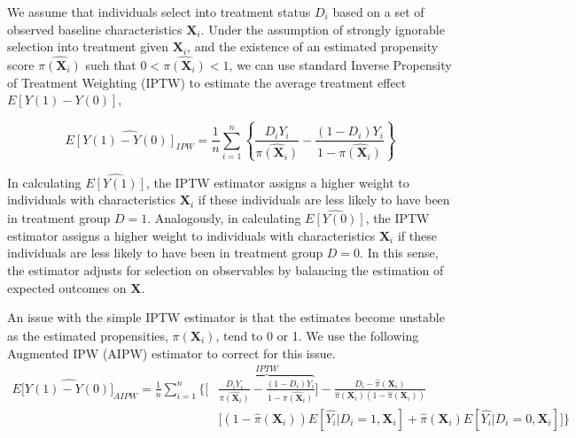 

We assume that individuals select into treatment status $D_i$ based on a set of observed baseline characteristics $\boldsymbol{X}_i$. Under the assumption of strongly ignorable selection into treatment given $\boldsymbol{X}_i$, and the existence of an estimated propensity score $\hat{\pi({\boldsymbol{X}_i})}$ such that $0<\hat{\pi({\boldsymbol{X}_i})}<1$, we can use standard Inverse Propensity of Treatment Weighting (IPTW) to estimate the average treatment effect $E[Y(1)-Y(0)]$,

\begin{equation}\label{eq:IPW}
\widehat{E[Y(1)-Y(0)]_{IPW}} = \frac{1}{n} \sum_{i=1}^{n} \left \{\frac{D_i Y_i}{\hat{\pi(\boldsymbol{X}_i)}} - \frac{(1-D_i)Y_i}{1-\hat{\pi(\boldsymbol{X}_i)}}\right \}
\end{equation}

In calculating $\widehat{E[Y(1)]}$, the IPTW estimator assigns a higher weight to individuals with characteristics $\boldsymbol{X}_i$ if these individuals are less likely to have been in treatment group $D = 1$. Analogously, in calculating $\widehat{E[Y(0)]}$,  the IPTW estimator assigns a higher weight to individuals with characteristics $\boldsymbol{X}_i$ if these individuals are less likely to have been in treatment group $D = 0$. In this sense, the estimator adjusts for selection on observables by balancing the estimation of expected outcomes on $\boldsymbol{X}$.

An issue with the simple IPTW estimator is that the estimates become unstable as the estimated propensities, $\hat{\pi(\boldsymbol{X}_i)}$, tend to 0 or 1. We use the following Augmented IPW (AIPW) estimator to correct for this issue. 
\begin{align}\label{eq:AIPW}
E[\widehat{Y(1)-Y(0)]}_{AIPW} = \frac{1}{n} \sum_{i=1}^{n} \bigg \{ \bigg[ & \overbrace{\frac{D_i Y_i}{\hat{\pi(\boldsymbol{X}_i)}} - \frac{(1-D_i)Y_i}{1-\hat{\pi(\boldsymbol{X}_i)}}}^{IPTW} \bigg]- \frac{D_i - \hat{\pi}(\boldsymbol{X}_i)}{\hat{\pi}(\boldsymbol{X}_i) (1-\hat{\pi}(\boldsymbol{X}_i))} \nonumber \\[10pt]
& \bigg[ (1-\hat{\pi}(\boldsymbol{X}_i)) E[\hat{Y_i}|D_i=1,\boldsymbol{X}_i] + \hat{\pi}(\boldsymbol{X}_i) E[\hat{Y_i}|D_i=0,\boldsymbol{X}_i] \bigg] \bigg \}
\end{align}

